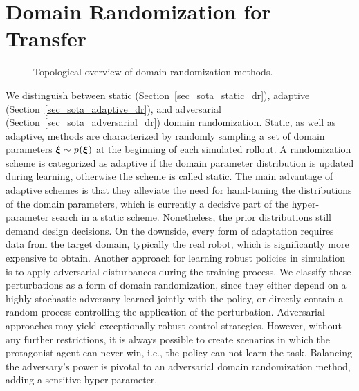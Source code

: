 \documentclass[utf8]{frontiersSCNS} %
\begin{document}
\section{Domain Randomization for \SimtoReal Transfer}
\label{sec_sota_domain_randomization}
\begin{figure} %
	\vspace*{-1.2\baselineskip}
	
	\caption[Topological overview of domain randomization]{Topological overview of domain randomization methods.}
	\label{fig_sota_domain_randomization}
\end{figure}
We distinguish between static (Section~\ref{sec_sota_static_dr}), adaptive (Section~\ref{sec_sota_adaptive_dr}), and adversarial (Section~\ref{sec_sota_adversarial_dr}) domain randomization.
Static, as well as adaptive, methods are characterized by randomly sampling a set of domain parameters $\domparams \sim \domparamdistr{\domparams}$ at the beginning of each simulated rollout.
A randomization scheme is categorized as adaptive if the domain parameter distribution is updated during learning, otherwise the scheme is called static.
The main advantage of adaptive schemes is that they alleviate the need for hand-tuning the distributions of the domain parameters, which is currently a decisive part of the hyper-parameter search in a static scheme.
Nonetheless, the prior distributions still demand design decisions.
On the downside, every form of adaptation requires data from the target domain, typically the real robot, which is significantly more expensive to obtain.
Another approach for learning robust policies in simulation is to apply adversarial disturbances during the training process. %
We classify these perturbations as a form of domain randomization, since they either depend on a highly stochastic adversary learned jointly with the policy, or directly contain a random process controlling the application of the perturbation.
Adversarial approaches may yield exceptionally robust control strategies.
However, without any further restrictions, it is always possible to create scenarios in which the protagonist agent can never win, i.e., the policy can not learn the task.
Balancing the adversary's power is pivotal to an adversarial domain randomization method, adding a sensitive hyper-parameter.
\end{document}
